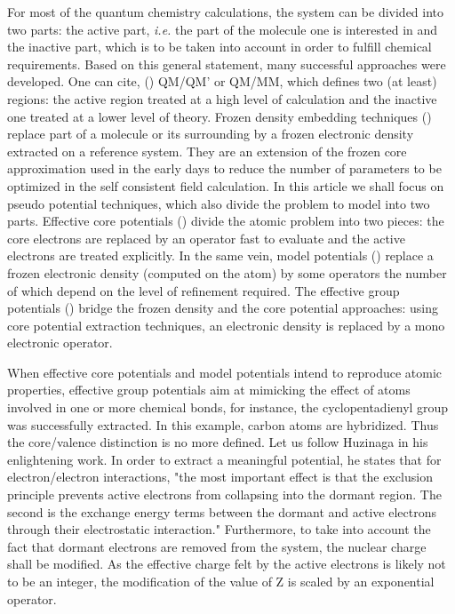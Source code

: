 \documentclass[journal=jctcce,manuscript=article]{achemso}
\begin{document}
For most of the quantum chemistry calculations, the system can be divided into two parts:
the active part, \emph{i.e.} the part of the molecule one is interested in and
the inactive part, which is to be taken into account in order to fulfill chemical requirements.
Based on this general statement, many successful approaches were developed.
One can cite, (\showCustomItem) QM/QM' or QM/MM, which defines two (at least) regions: the active region
treated at a high level of calculation and the inactive one treated at a lower level of
theory.\cite{chung_oniom_2015}
Frozen density embedding techniques (\showCustomItem) replace part of a molecule or its surrounding
by a frozen electronic density extracted on a reference system.\cite{wesolowski_frozen-density_2015}
They are an extension of the frozen core approximation used in the early days to reduce
the number of parameters to be optimized in the self consistent field calculation.
In this article we shall focus on pseudo potential techniques, which also
divide the problem to model into two parts.
Effective core potentials (\showCustomItem) divide the atomic problem into two pieces: the core electrons are
replaced by an operator fast to evaluate and the active electrons are treated
explicitly.\cite{dolg_relativistic_2012}
In the same vein, model potentials (\showCustomItem) replace a frozen electronic density (computed on the atom)
by some operators the number of which depend on the level of
refinement required.\cite{huzinaga_1994_1995}
The effective group potentials (\showCustomItem) bridge the frozen density and the core potential
approaches: using core potential extraction techniques, an electronic density is
replaced by a mono electronic operator.\cite{carissan_what_2006}

When effective core potentials and model potentials intend to reproduce atomic properties,
effective group potentials aim at mimicking the effect of atoms involved in one or more chemical
bonds, for instance, the cyclopentadienyl group was successfully extracted.
In this example, carbon atoms are hybridized.
Thus the core/valence distinction is no more defined.
Let us follow Huzinaga in his enlightening work.\cite{huzinaga_effective_1991}
In order to extract a meaningful potential, he states that for electron/electron interactions, 
"the most important effect is that the exclusion principle prevents active electrons
from collapsing into the dormant region.
The second is the exchange energy terms between the dormant and active electrons
through their electrostatic interaction."
Furthermore, to take into account the fact that dormant electrons are removed from the
system, the nuclear charge shall be modified.
As the effective charge felt by the active electrons is likely not to be an integer,
the modification of the value of Z is scaled by an exponential operator.
\end{document}
